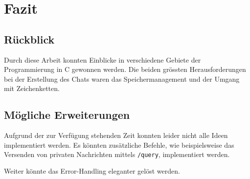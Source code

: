 \documentclass[a4paper]{article}
\begin{document}
\section{Fazit}
\subsection{Rückblick}
Durch diese Arbeit konnten Einblicke in verschiedene Gebiete der Programmierung in C gewonnen werden. Die beiden grössten Herausforderungen bei der Erstellung des Chats waren das Speichermanagement und der Umgang mit Zeichenketten.

\subsection{Mögliche Erweiterungen}
Aufgrund der zur Verfügung stehenden Zeit konnten leider nicht alle Ideen implementiert werden. Es könnten zusätzliche Befehle, wie beispielsweise das Versenden von privaten Nachrichten mittels \texttt{/query}, implementiert werden.

Weiter könnte das Error-Handling eleganter gelöst werden.
\end{document}
